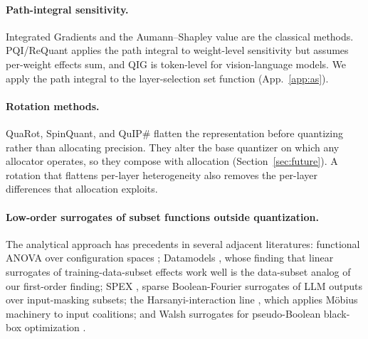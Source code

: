 \paragraph{Path-integral sensitivity.} Integrated Gradients \citep{sundararajan2017ig} and the
Aumann--Shapley value \citep{aumann1974values} are the classical methods. PQI/ReQuant \citep{hu2025pqi}
applies the path integral to weight-level sensitivity but assumes per-weight effects sum, and QIG
\citep{qig2026} is
token-level for vision-language models. We apply the path integral to the layer-selection set function
(App.~\ref{app:as}).

\paragraph{Rotation methods.} QuaRot, SpinQuant, and QuIP\#
\citep{ashkboos2024quarot,liu2024spinquant,tseng2024quipsharp} flatten the representation before
quantizing rather than allocating precision. They alter the base quantizer on which any allocator
operates, so they compose with allocation (Section~\ref{sec:future}). A rotation that flattens per-layer
heterogeneity also removes the per-layer differences that allocation exploits.

\paragraph{Low-order surrogates of subset functions outside quantization.} The analytical approach has
precedents in several adjacent literatures: functional ANOVA over configuration spaces
\citep{hutter2014fanova}; Datamodels \citep{ilyas2022datamodels}, whose finding that linear surrogates of
training-data-subset effects work well is the data-subset analog of our first-order finding; SPEX
\citep{spex2025}, sparse Boolean-Fourier surrogates of LLM outputs over input-masking subsets; the
Harsanyi-interaction line \citep{ren2023harsanyi}, which applies M\"obius machinery to input coalitions;
and Walsh surrogates for pseudo-Boolean black-box optimization \citep{lepretre2019walsh,bocs2018}. 

